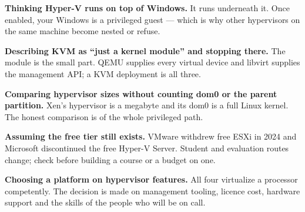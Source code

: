 \begin{pitfall}
\begin{tight}
  \item \textbf{Thinking Hyper-V runs on top of Windows.} It runs underneath
        it. Once enabled, your Windows is a privileged guest --- which is why
        other hypervisors on the same machine become nested or refuse.
  \item \textbf{Describing KVM as ``just a kernel module'' and stopping
        there.} The module is the small part. QEMU supplies every virtual
        device and libvirt supplies the management API; a KVM deployment is all
        three.
  \item \textbf{Comparing hypervisor sizes without counting dom0 or the parent
        partition.} Xen's hypervisor is a megabyte and its dom0 is a full Linux
        kernel. The honest comparison is of the whole privileged path.
  \item \textbf{Assuming the free tier still exists.} VMware withdrew free ESXi
        in 2024 and Microsoft discontinued the free Hyper-V Server. Student and
        evaluation routes change; check before building a course or a budget on
        one.
  \item \textbf{Choosing a platform on hypervisor features.} All four
        virtualize a processor competently. The decision is made on management
        tooling, licence cost, hardware support and the skills of the people
        who will be on call.
\end{tight}
\end{pitfall}


